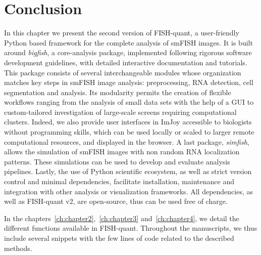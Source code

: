 \section{Conclusion}
\label{sec:conclusion}

In this chapter we present the second version of FISH-quant, a user-friendly Python based framework for the complete analysis of \ac{smFISH} images.
It is built around \emph{bigfish}, a core-analysis package, implemented following rigorous software development guidelines, with detailed interactive documentation and tutorials.
This package consists of several interchangeable modules whose organization matches key steps in \ac{smFISH} image analysis: preprocessing, \ac{RNA} detection, cell segmentation and analysis.
Its modularity permits the creation of flexible workflows ranging from the analysis of small data sets with the help of a \ac{GUI} to custom-tailored investigation of large-scale screens requiring computational clusters.
Indeed, we also provide user interfaces in ImJoy accessible to biologists without programming skills, which can be used locally or scaled to larger remote computational resources, and displayed in the browser.
A last package, \emph{simfish}, allows the simulation of \ac{smFISH} images with non random \ac{RNA} localization patterns.
These simulations can be used to develop and evaluate analysis pipelines.
Lastly, the use of Python scientific ecosystem, as well as strict version control and minimal dependencies, facilitate installation, maintenance and integration with other analysis or visualization frameworks.
All dependencies, as well as FISH-quant v2, are open-source, thus can be used free of charge.

In the chapters~\ref{ch:chapter2},~\ref{ch:chapter3} and~\ref{ch:chapter4}, we detail the different functions available in FISH-quant.
Throughout the manuscripts, we thus include several snippets with the few lines of code related to the described methods.
